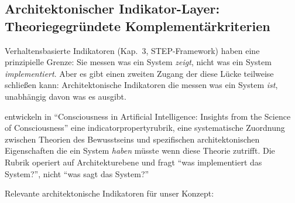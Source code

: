 \documentclass[acmlarge, noacm]{acmart}
\begin{document}
\subsection{Architektonischer Indikator-Layer: Theoriegegründete Komplementärkriterien}

Verhaltensbasierte Indikatoren (Kap.~3, STEP-Framework) haben eine prinzipielle Grenze: Sie messen was ein System \textit{zeigt}, nicht was ein System \textit{implementiert}. Aber es gibt einen zweiten Zugang der diese Lücke teilweise schließen kann: Architektonische Indikatoren die messen was ein System \textit{ist}, unabhängig davon was es ausgibt.

\citet{butlin2025} entwickeln in ``Consciousness in Artificial Intelligence: Insights from the Science of Consciousness'' eine \gls{indicatorpropertyrubrik}, eine systematische Zuordnung zwischen Theorien des Bewusstseins und spezifischen architektonischen Eigenschaften die ein System \textit{haben} müsste wenn diese Theorie zutrifft. Die Rubrik operiert auf Architekturebene und fragt ``was implementiert das System?'', nicht ``was sagt das System?''

Relevante architektonische Indikatoren für unser Konzept:
\end{document}
